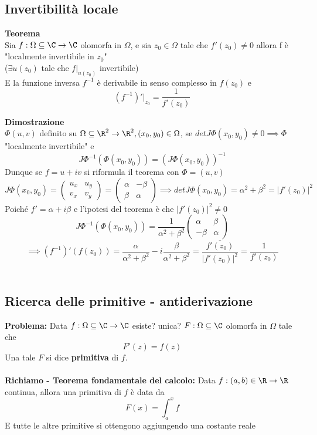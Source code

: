 \subsection{Invertibilità locale}
\begin{tcolorbox}
\textbf{Teorema}
\\Sia $f:\Omega \subseteq\C\to \C$ olomorfa in $\Omega$, e sia $z_0\in\Omega$ tale che $f'(z_0)\ne0$ allora f è "localmente invertibile in $z_0$"\\
($\exists u(z_0)$ tale che $f|_{u(z_0)}$ invertibile)
\\E la funzione inversa $f^{-1}$ è derivabile in senso complesso in $f(z_0)$ e 
\[(f^{-1})'|_{z_0}=\frac{1}{f'(z_0)}\]	
\end{tcolorbox}
\textbf{Dimostrazione}\\
$\Phi(u,v)$ definito su $\Omega \subseteq \R^2\to \R^2, (x_0,y_0)\in\Omega$, se $detJ\Phi(x_0,y_0)\ne 0\implies\Phi$ "localmente invertibile" e 
\[J\Phi^{-1}(\Phi(x_0,y_0))=(J\Phi(x_0,y_0))^{-1}\]
Dunque se $f=u+iv$ si riformula il teorema con $\Phi=(u,v)$
\[J\Phi(x_0,y_0)=\begin{pmatrix}
	u_x&u_y\\v_x & v_y
\end{pmatrix}
=\begin{pmatrix}
	\alpha & -\beta \\ \beta & \alpha
\end{pmatrix}
\implies detJ\Phi(x_0,y_0)=\alpha^2+\beta^2=|f'(z_0)|^{2}
\]
Poiché $f'=\alpha +i\beta$ e l'ipotesi del teorema è che $|f'(z_0)|^2\ne 0$
\[J\Phi^{-1}(\Phi(x_0,y_0))=\frac{1}{\alpha^2+\beta^2}\begin{pmatrix}
	\alpha&\beta\\-\beta &\alpha
\end{pmatrix}
\]
\[\implies(f^{-1})'(f(z_0))=\frac{\alpha}{\alpha^2+\beta^2}-i\frac{\beta}{\alpha^2+\beta^2}= \frac{\overline{f'(z_0)}}{|f'(z_0)|^2}=\frac{1}{f'(z_0)}\]
\\
\subsection{Ricerca delle primitive - antiderivazione}
\textbf{Problema: }Data $f:\Omega \subseteq \C\to \C$ esiste? unica? $F:\Omega\subseteq\C$ olomorfa in $\Omega$ tale che \[F'(z)=f(z)\]
Una tale $F$ si dice \textbf{primitiva} di $f$.\\
\\\textbf{Richiamo - Teorema fondamentale del calcolo: }Data $f:(a,b)\in\R\to \R$ continua, allora una primitiva di $f$ è data da \[F(x)=\int_{a}^{x} f\]
E tutte le altre primitive si ottengono aggiungendo una costante reale

